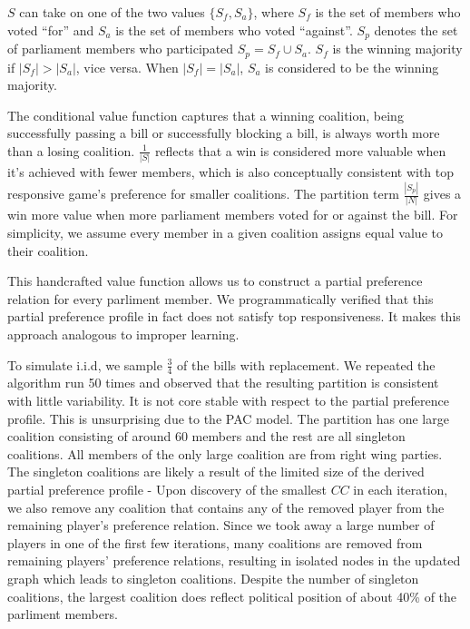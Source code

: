 \documentclass[letterpaper]{article} %
\begin{document}
$S$ can take on one of the two values $\{S_f, S_a\}$, where $S_f$ is the set of members who voted ``for'' and $S_a$ is the set of members who voted ``against''. $S_p$ denotes the set of parliament members who participated $S_p = S_f \cup S_a$. $S_f$ is the winning majority if $|S_f| > |S_a|$, vice versa. When $|S_f| = |S_a|$, $S_a$ is considered to be the winning majority.

The conditional value function captures that a winning coalition, being successfully passing a bill or successfully blocking a bill, is always worth more than a losing coalition. $\frac{1}{|S|}$ reflects that a win is considered more valuable when it's achieved with fewer members, which is also conceptually consistent with top responsive game's preference for smaller coalitions. The partition term $\frac{|S_p|}{|N|}$ gives a win more value when more parliament members voted for or against the bill. For simplicity, we assume every member in a given coalition assigns equal value to their coalition.

This handcrafted value function allows us to construct a partial preference relation for every parliment member. We programmatically verified that this partial preference profile in fact does not satisfy top responsiveness. It makes this approach analogous to improper learning.

To simulate i.i.d, we sample $\frac{3}{4}$ of the bills with replacement. We repeated the algorithm run 50 times and observed that the resulting partition is consistent with little variability. It is not core stable with respect to the partial preference profile. This is unsurprising due to the PAC model. The partition has one large coalition consisting of around 60 members and the rest are all singleton coalitions. All members of the only large coalition are from right wing parties. The singleton coalitions are likely a result of the limited size of the derived partial preference profile - Upon discovery of the smallest $CC$ in each iteration, we also remove any coalition that contains any of the removed player from the remaining player's preference relation. Since we took away a large number of players in one of the first few iterations, many coalitions are removed from remaining players' preference relations, resulting in isolated nodes in the updated graph which leads to singleton coalitions. Despite the number of singleton coalitions, the largest coalition does reflect political position of about 40\% of the parliment members.
\end{document}
